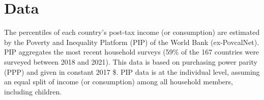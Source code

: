 
\section{Data}\label{subsec:data}
The percentiles of each country's post-tax income (or consumption) are estimated by the Poverty and Inequality Platform (PIP) of the World Bank (ex-PovcalNet). PIP aggregates the most recent household surveys (59\% of the 167 countries were surveyed between 2018 and 2021). This data is based on purchasing power parity (PPP) and given in constant 2017 \$. PIP data is %
at the individual level, assuming an equal split of income (or consumption) among all household members, including children. %

